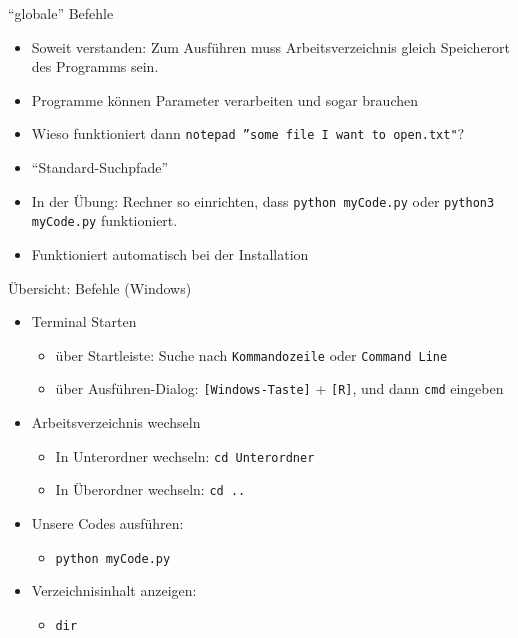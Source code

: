 \begin{frame}{\enquote{globale} Befehle}
%
\begin{itemize}
\item Soweit verstanden: Zum Ausführen muss Arbeitsverzeichnis gleich Speicherort des Programms sein.
\item Programme können Parameter verarbeiten und sogar brauchen
\item Wieso funktioniert dann \texttt{notepad ''some file I want to open.txt"}?
\item[\Thus] \enquote{Standard-Suchpfade}
\item[\Thus] In der Übung: Rechner so einrichten, dass \texttt{python myCode.py} oder \texttt{python3 myCode.py} funktioniert.
\item Funktioniert \idR automatisch bei der Installation
\end{itemize}
%
\end{frame}


\begin{frame}{Übersicht: Befehle (Windows)}
\begin{itemize}
\item Terminal Starten
	\begin{itemize}
	\item über Startleiste: Suche nach \texttt{Kommandozeile} oder \texttt{Command Line}
	\item über Ausführen-Dialog: \texttt{[Windows-Taste]} + \texttt{[R]}, und dann \texttt{cmd} eingeben
	\end{itemize}
\item Arbeitsverzeichnis wechseln
	\begin{itemize}
	\item In Unterordner wechseln: \texttt{cd Unterordner}
	\item In Überordner wechseln: \texttt{cd ..}
	\end{itemize}
\item Unsere Codes ausführen:
	\begin{itemize}
	\item \texttt{python myCode.py}
	\end{itemize}
\item Verzeichnisinhalt anzeigen:
	\begin{itemize}
	\item \texttt{dir}
	\end{itemize}
\end{itemize}
\end{frame}


